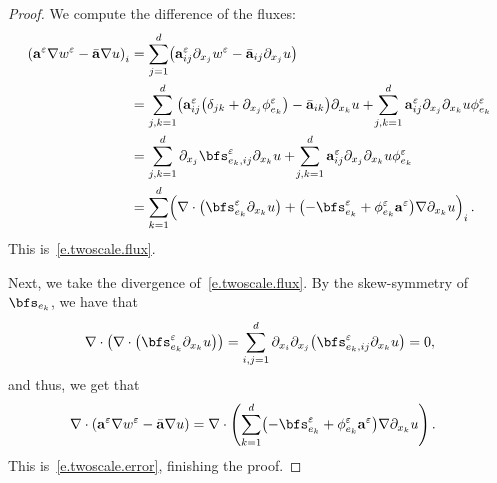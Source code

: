 \documentclass[11pt,twoside]{article} %
\numberwithin{equation}{section}
\theoremstyle{definition}
\let\originalleft\left
\let\originalright\right
\renewcommand{\left}{\mathopen{}\mathclose\bgroup\originalleft}
\renewcommand{\right}{\aftergroup\egroup\originalright}
\newcommand{\eps}{\varepsilon}
\newcommand{\ep}{\eps}
\renewcommand{\a}{\mathbf{a}}
\newcommand{\ahom}{\bar{\a}}
\begin{document}
\begin{proof}
We  compute the difference of the fluxes:
\begin{align*}
\left( \a^\ep \nabla w^\ep - \ahom \nabla u \right)_i
& = 
\sum_{j=1}^d
\left(
\a^\ep_{ij} \partial_{x_j} w^\ep 
- \ahom_{ij} \partial_{x_j} u
\right)
\notag \\ &
=
\sum_{j,k=1}^d
\left( \a^\ep_{ij}
\left( \delta_{jk} + \partial_{x_j} \phi^\ep_{e_k} \right)
- \ahom_{ik}\right)
\partial_{x_k}u
+\!
\sum_{j,k=1}^d 
\a^\ep_{ij} \partial_{x_j}\partial_{x_k} u \phi^\ep_{e_k}
\notag \\ & 
= 
\sum_{j,k=1}^d
\partial_{x_j} \bfs_{e_k,ij}^\ep \partial_{x_k}u
+\!
\sum_{j,k=1}^d 
\a^\ep_{ij} \partial_{x_j}\partial_{x_k} u \phi^\ep_{e_k}
\notag \\ & 
=
\sum_{k=1}^d \Bigl( 
\nabla \cdot \left( \bfs^\ep_{e_k}  \partial_{x_k} u  \right)
+
\bigl( - \bfs^\ep_{e_k} + \phi_{e_k}^\ep \a^\ep \bigr) \nabla \partial_{x_k} u
\Bigr)_i
\,.
\end{align*}
This is~\eqref{e.twoscale.flux}.

\smallskip

Next, we take the divergence of~\eqref{e.twoscale.flux}. By the skew-symmetry of~$\bfs_{e_k}$, we have that 
\begin{align*}  
\nabla \cdot  \left( \nabla \cdot \left( \bfs^\ep_{e_k}  \partial_{x_k} u  \right) \right) = \sum_{i,j=1}^d \partial_{x_i} \partial_{x_j} \left( \bfs_{e_k,ij}^\ep\partial_{x_k}u\right) = 0, 
\end{align*}
and thus, we get that
\begin{align*}
\nabla \cdot 
\left( \a^\ep \nabla w^\ep - \ahom \nabla u \right)
&
= 
\nabla\cdot \left( \sum_{k=1}^d 
\left(
- \bfs_{e_k}^\ep 
+
\phi_{e_k}^\ep \a^\ep 
\right) \nabla \partial_{x_k} u \right)  \,.
\end{align*}
This is~\eqref{e.twoscale.error}, finishing the proof. 
\end{proof}
\end{document}

